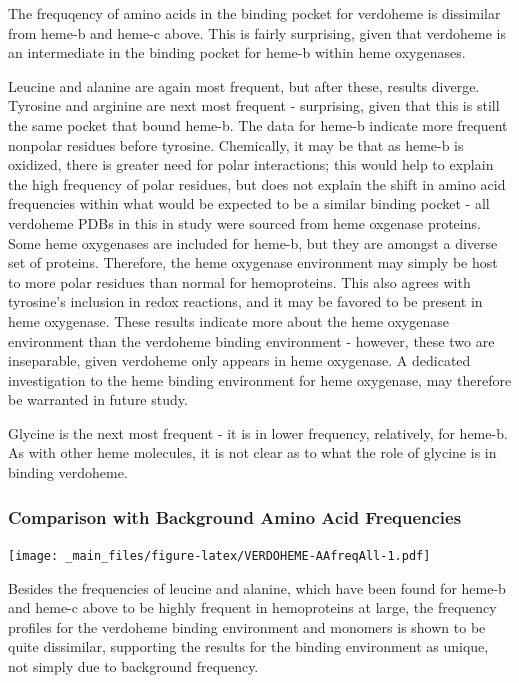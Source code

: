 \documentclass[a4paper, nobind]{templates/ociamthesis}
\let\origfigure\figure
\let\endorigfigure\endfigure
\renewenvironment{figure}[1][2] {
    \expandafter\origfigure\expandafter[H]
} {
    \endorigfigure
}
\begin{document}
The frequqency of amino acids in the binding pocket for verdoheme is dissimilar from heme-b and heme-c above. This is fairly surprising, given that verdoheme is an intermediate in the binding pocket for heme-b within heme oxygenases.

Leucine and alanine are again most frequent, but after these, results diverge. Tyrosine and arginine are next most frequent - surprising, given that this is still the same pocket that bound heme-b. The data for heme-b indicate more frequent nonpolar residues before tyrosine. Chemically, it may be that as heme-b is oxidized, there is greater need for polar interactions; this would help to explain the high frequency of polar residues, but does not explain the shift in amino acid frequencies within what would be expected to be a similar binding pocket - all verdoheme PDBs in this in study were sourced from heme oxgenase proteins. Some heme oxygenases are included for heme-b, but they are amongst a diverse set of proteins. Therefore, the heme oxygenase environment may simply be host to more polar residues than normal for hemoproteins. This also agrees with tyrosine's inclusion in redox reactions, and it may be favored to be present in heme oxygenase. These results indicate more about the heme oxygenase environment than the verdoheme binding environment - however, these two are inseparable, given verdoheme only appears in heme oxygenase. A dedicated investigation to the heme binding environment for heme oxygenase, may therefore be warranted in future study.

Glycine is the next most frequent - it is in lower frequency, relatively, for heme-b. As with other heme molecules, it is not clear as to what the role of glycine is in binding verdoheme.

\hypertarget{comparison-with-background-amino-acid-frequencies-2}{%
\subsubsection{Comparison with Background Amino Acid Frequencies}\label{comparison-with-background-amino-acid-frequencies-2}}

\begin{figure}
\centering
\texttt{[image: \_main\_files/figure-latex/VERDOHEME-AAfreqAll-1.pdf]}
\caption{\label{fig:VERDOHEME-AAfreqAll}VERDOHEME: AA Frequency of Monomer}
\end{figure}

Besides the frequencies of leucine and alanine, which have been found for heme-b and heme-c above to be highly frequent in hemoproteins at large, the frequency profiles for the verdoheme binding environment and monomers is shown to be quite dissimilar, supporting the results for the binding environment as unique, not simply due to background frequency.
\end{document}
